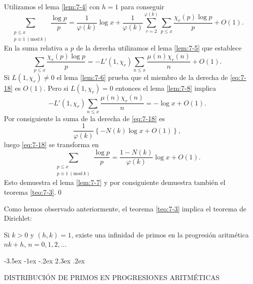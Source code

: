 \documentclass[12pt,a4paper]{book}
\makeatletter
\renewcommand\section{\@startsection{section}{1}{\z@}%
  {-3.5ex \@plus -1ex \@minus -.2ex}%
  {2.3ex \@plus .2ex}%
  {\normalfont\Large\bfseries\raggedright}}
\makeatother
\begin{document}
    Utilizamos el lema \ref{lem:7-4} con $h=1$ para conseguir
    \begin{equation}\label{eq:7-18}
        \sum_{\substack{p\leq x\\p\equiv1\ (\mathrm{mod}\ k)}}\frac{\log p}{p}
        =\frac{1}{\varphi(k)}\log x+\frac{1}{\varphi(k)}\sum_{r=2}^{\varphi(k)}
        \sum_{p\leq x}\frac{\chi_{r}(p)\log p}{p}+O(1).
    \end{equation}
    En la suma relativa a $p$ de la derecha utilizamos el lema \ref{lem:7-5} que establece
    \begin{equation*}
        \sum_{p\leq x}\frac{\chi_{r}(p)\log p}{p}=-L'(1,\chi_{r})\sum_{n\leq x}\frac{\mu(n)\chi_{r}(n)}{n}+O(1).
    \end{equation*}
    Si $L(1,\chi_{r})\neq0$ el lema \ref{lem:7-6} prueba que el miembro de la derecha de
    \eqref{eq:7-18} es $O(1)$. Pero si $L(1,\chi_{r})=0$ entonces el lema \ref{lem:7-8}
    implica
    \begin{equation*}
        -L'(1,\chi_{r})\sum_{n\leq x}\frac{\mu(n)\chi_{r}(n)}{n}=-\log x+O(1).
    \end{equation*}
    Por consiguiente la suma de la derecha de \eqref{eq:7-18} es
    \begin{equation*}
        \frac{1}{\varphi(k)}\left\{-N(k)\log x+O(1)\right\},
    \end{equation*}
    luego \eqref{eq:7-18} se transforma en
    \begin{equation*}
        \sum_{\substack{p\leq x\\p\equiv1\ (\mathrm{mod}\ k)}}\frac{\log p}{p}
        =\frac{1-N(k)}{\varphi(k)}\log x+O(1).
    \end{equation*}
    Esto demuestra el lema \ref{lem:7-7} y por consiguiente demuestra también el teorema
    \ref{teo:7-3}.\qed

    Como hemos observado anteriormente, el teorema \ref{teo:7-3} implica el teorema de
    Dirichlet:

    \begin{teorema}
        Si $k>0$ y $(h,k)=1$, existe una infinidad de primos en la progresión aritmética
        $nk+h$, $n=0,1,2,\dots$
    \end{teorema}

    \section{DISTRIBUCIÓN DE PRIMOS EN PROGRESIONES ARITMÉTICAS}
\end{document}
